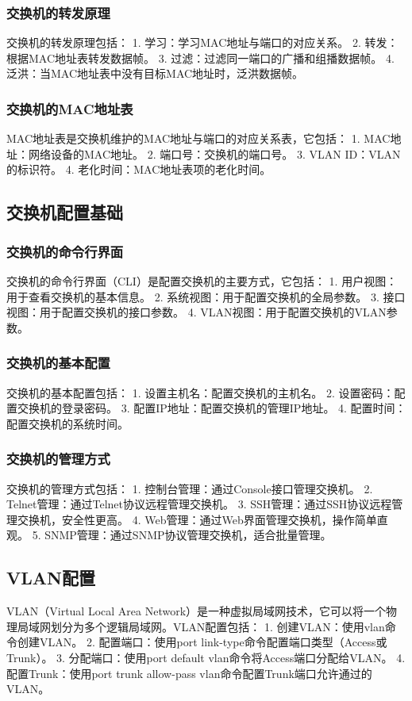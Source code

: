 \documentclass{book}
\begin{document}
\subsubsection{交换机的转发原理}
交换机的转发原理包括：
1. 学习：学习MAC地址与端口的对应关系。
2. 转发：根据MAC地址表转发数据帧。
3. 过滤：过滤同一端口的广播和组播数据帧。
4. 泛洪：当MAC地址表中没有目标MAC地址时，泛洪数据帧。
\subsubsection{交换机的MAC地址表}
MAC地址表是交换机维护的MAC地址与端口的对应关系表，它包括：
1. MAC地址：网络设备的MAC地址。
2. 端口号：交换机的端口号。
3. VLAN ID：VLAN的标识符。
4. 老化时间：MAC地址表项的老化时间。
\subsection{交换机配置基础}
\subsubsection{交换机的命令行界面}
交换机的命令行界面（CLI）是配置交换机的主要方式，它包括：
1. 用户视图：用于查看交换机的基本信息。
2. 系统视图：用于配置交换机的全局参数。
3. 接口视图：用于配置交换机的接口参数。
4. VLAN视图：用于配置交换机的VLAN参数。
\subsubsection{交换机的基本配置}
交换机的基本配置包括：
1. 设置主机名：配置交换机的主机名。
2. 设置密码：配置交换机的登录密码。
3. 配置IP地址：配置交换机的管理IP地址。
4. 配置时间：配置交换机的系统时间。
\subsubsection{交换机的管理方式}
交换机的管理方式包括：
1. 控制台管理：通过Console接口管理交换机。
2. Telnet管理：通过Telnet协议远程管理交换机。
3. SSH管理：通过SSH协议远程管理交换机，安全性更高。
4. Web管理：通过Web界面管理交换机，操作简单直观。
5. SNMP管理：通过SNMP协议管理交换机，适合批量管理。
\subsection{VLAN配置}
VLAN（Virtual Local Area Network）是一种虚拟局域网技术，它可以将一个物理局域网划分为多个逻辑局域网。VLAN配置包括：
1. 创建VLAN：使用vlan命令创建VLAN。
2. 配置端口：使用port link-type命令配置端口类型（Access或Trunk）。
3. 分配端口：使用port default vlan命令将Access端口分配给VLAN。
4. 配置Trunk：使用port trunk allow-pass vlan命令配置Trunk端口允许通过的VLAN。
\end{document}

